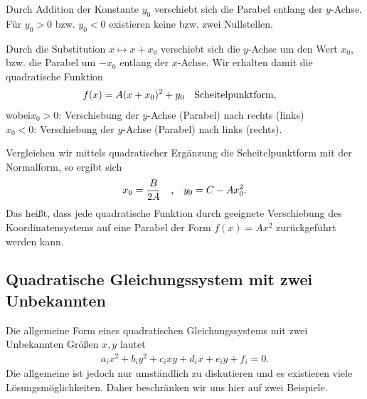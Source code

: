 Durch Addition der Konstante $y_0$ verschiebt sich die Parabel entlang der $y$-Achse. Für $y_0 > 0$ bzw. $y_0 <0$ existieren keine bzw. zwei Nullstellen.

Durch die Substitution $x \mapsto x+x_0$ verschiebt sich die $y$-Achse um den Wert $x_0$, bzw. die Parabel um $\minus x_0$ entlang der $x$-Achse. Wir erhalten damit die quadratische Funktion
\begin{align}
    f(x) = A(x+x_0)^2 + y_0 \qq{Scheitelpunktform,}
\end{align}
wobei\quad$x_0 > 0$: Verschiebung der $y$-Achse (Parabel) nach rechts (links) \\
\hphantom{wobei}\quad$x_0 < 0$: Verschiebung der $y$-Achse (Parabel) nach links (rechts).

\begin{wrapfigure}{r}{6cm}
    \centering
    \vspace{-5mm}
    \vspace{-5mm}
\end{wrapfigure}

Vergleichen wir mittels quadratischer Ergänzung die Scheitelpunktform mit der Normalform, so ergibt sich 
\begin{align}
    x_0 = \frac{B}{2A} \qq{,} y_0 = C -A x_0^2.
\end{align}
Das heißt, dass jede quadratische Funktion durch geeignete Verschiebung des Koordinatensystems auf eine Parabel der Form $f(x) = A x^2$ zurückgeführt werden kann.

\subsection{Quadratische Gleichungssystem mit zwei Unbekannten}

Die allgemeine Form eines quadratischen Gleichungssystems mit zwei Unbekannten Größen $x,y$ lautet 
\begin{align}
    a_i x^2 + b_i y^2 + c_i xy + d_i x + e_i y + f_i = 0.
\end{align}
Die allgemeine ist jedoch nur umständlich zu diskutieren und es existieren viele Lösungsmöglichkeiten. Daher beschränken wir uns hier auf zwei Beispiele. 